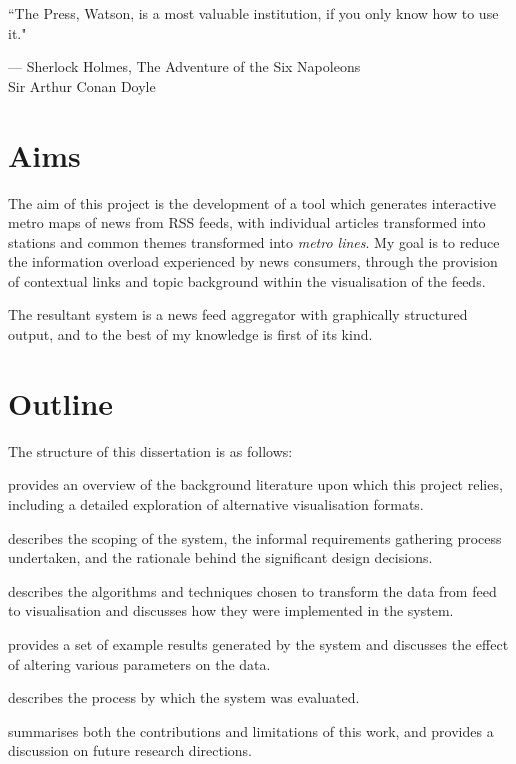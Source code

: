 \epigraph{``The Press, Watson, is a most valuable institution, if you only know how to use it."}{--- \textup{Sherlock Holmes}, The Adventure of the Six Napoleons\\[0.2cm] \textup{Sir Arthur Conan Doyle}}

\section*{Aims}
The aim of this project is the development of a tool which generates interactive metro maps of news from RSS feeds, with individual articles transformed into stations and common themes transformed into \textit{metro lines}. My goal is to reduce the information overload experienced by news consumers, through the provision of contextual links and topic background within the visualisation of the feeds.

The resultant system is a news feed aggregator with graphically structured output, and to the best of my knowledge is first of its kind.

\section*{Outline}

The structure of this dissertation is as follows:
\begin{description}[leftmargin=5.6em,style=nextline]
	\item [Chapter \ref{c:litreview}] provides an overview of the background literature upon which this project relies, including a detailed exploration of alternative visualisation formats.
	\item [Chapter \ref{c:reqs}] describes the scoping of the system, the informal requirements gathering process undertaken, and the rationale behind the significant design decisions.
	\item [Chapter \ref{c:implementation}] describes the algorithms and techniques chosen to transform the data from feed to visualisation and discusses how they were implemented in the system.
	\item [Chapter \ref{c:results}] provides a set of example results generated by the system and discusses the effect of altering various parameters on the data.
	\item [Chapter \ref{c:evaluation}] describes the process by which the system was evaluated.
	\item [Chapter \ref{c:conclusions}] summarises both the contributions and limitations of this work, and provides a discussion on future research directions.
\end{description}

